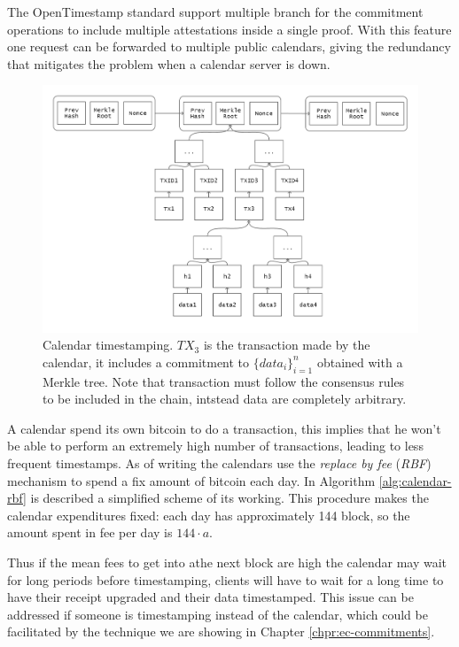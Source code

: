 The OpenTimestamp standard support multiple branch for the commitment operations to include multiple attestations inside a single proof. With this feature one request can be forwarded to multiple public calendars, giving the redundancy that mitigates the problem when a calendar server is down.

\begin{figure}
	\begin{center}
		\includegraphics[width=\linewidth]{Images/bitcoin-chain-calendar.png}
		\caption[Calendar timestamping.]{Calendar timestamping. $TX_3$ is the transaction made by the calendar, it includes a commitment to $\{data_i\}_{i=1}^n$ obtained with a Merkle tree. Note that transaction must follow the consensus rules to be included in the chain, intstead data are completely arbitrary.}
		\label{fig:chain-calendar}
	\end{center}
\end{figure}

A calendar spend its own bitcoin to do a transaction, this implies that he won't be able to perform an extremely high number of transactions, leading to less frequent timestamps. As of writing the calendars use the \textit{replace by fee} (\textit{RBF}) mechanism to spend a fix amount of bitcoin each day. In Algorithm \ref{alg:calendar-rbf} is described a simplified scheme of its working.
This procedure makes the calendar expenditures fixed: each day has approximately 144 block, so the amount spent in fee per day is $144 \cdot a$.

Thus if the mean fees to get into athe next block are high the calendar may wait for long periods before timestamping, clients will have to wait for a long time to have their receipt upgraded and their data timestamped. This issue can be addressed if someone is timestamping instead of the calendar, which could be facilitated by the technique we are showing in Chapter \ref{chpr:ec-commitments}. 

